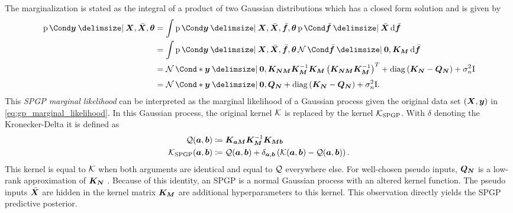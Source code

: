 The marginalization is stated as the integral of a product of two Gaussian distributions which has a closed form solution and is given by
\begin{align}
    \Prob{\mat{y} \given \mat{X}, \ps{\mat{X}}, \mat{\theta}} &= \int \Prob{\mat{y} \given \mat{X}, \ps{\mat{X}}, \ps{\mat{f}}, \mat{\theta}} \Prob{\ps{\mat{f}} \given \ps{\mat{X}}} \diff \ps{\mat{f}} \\
    &= \int \Prob{\mat{y} \given \mat{X}, \ps{\mat{X}}, \ps{\mat{f}}, \mat{\theta}} \Gaussian{\ps{\mat{f}} \given \mat{0}, \mat{K_M}} \diff \ps{\mat{f}} \\
    &= \Gaussian*{\mat{y} \given \mat{0}, \mat{K_{NM}} \mat{K_M}^{-1} \mat{K_M} \left( \mat{K_{NM}} \mat{K_M}^{-1} \right)^T + \diag\left( \mat{K_N} - \mat{Q_N} \right) + \sigma_n^2 \Eye} \\
    &= \Gaussian*{\vphantom{\left( \mat{K_M}^{-1} \right)^T} \mat{y} \given \mat{0}, \mat{Q_N} + \diag\left( \mat{K_N} - \mat{Q_N} \right) + \sigma_n^2 \Eye}.
\end{align}
This \emph{SPGP marginal likelihood} can be interpreted as the marginal likelihood of a Gaussian process given the original data set $(\bm{X}, \bm{y})$ in \cref{eq:gp_marginal_likelihood}.
In this Gaussian process, the original kernel $\operatorname{\mathcal{K}}$ is replaced by the kernel $\operatorname{\mathcal{K}}_{\text{SPGP}}$.
With $\delta$ denoting the Kronecker-Delta it is defined as
\begin{align}
    \operatorname{\mathcal{Q}}(\bm{a}, \bm{b}) &\coloneqq \bm{K_{aM}} \bm{K_M}^{-1} \bm{K_{Mb}} \\
    \operatorname{\mathcal{K}}_{\text{SPGP}}(\bm{a}, \bm{b}) &\coloneqq \operatorname{\mathcal{Q}}(\bm{a}, \bm{b}) + \delta_{\bm{a}, \bm{b}} \left( \operatorname{\mathcal{K}}(\bm{a}, \bm{b}) - \operatorname{\mathcal{Q}}(\bm{a}, \bm{b}) \right).
\end{align}
This kernel is equal to $\operatorname{\mathcal{K}}$ when both arguments are identical and equal to $\operatorname{\mathcal{Q}}$ everywhere else.
For well-chosen pseudo inputs, $\bm{Q_N}$ is a low-rank approximation of $\bm{K_N}$ \cite{snelson_flexible_2007}.
Because of this identity, an SPGP is a normal Gaussian process with an altered kernel function.
The pseudo inputs $\bar{\bm{X}}$ are hidden in the kernel matrix $\bm{K_M}$ are additional hyperparameters to this kernel.
This observation directly yields the SPGP predictive posterior.
